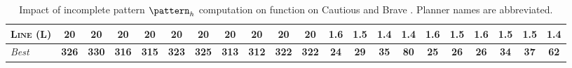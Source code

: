 \begin{table}[tb]
{\begin{tabular}{|l||cccccccccc||cccccccccc||}
\textsc{Line} (L)&\textbf{20}&\textbf{20}&\textbf{20}&\textbf{20}&\textbf{20}&\textbf{20}&\textbf{20}&\textbf{20}&\textbf{20}&\textbf{20}&1.6&1.5&\textbf{1.4}&\textbf{1.4}&1.6&1.5&1.6&1.5&1.5&\textbf{1.4}
\\\hline
\textit{Best}&\textbf{326}&\textbf{330}&\textbf{316}&\textbf{315}&\textbf{323}&\textbf{325}&\textbf{313}&\textbf{312}&\textbf{322}&\textbf{322}&\textbf{24}&\textbf{29}&\textbf{35}&\textbf{80}&\textbf{25}&\textbf{26}&\textbf{26}&\textbf{34}&\textbf{37}&\textbf{62}\\\hline

        \end{tabular}}
        \caption{Impact of incomplete pattern $\pattern_h$ computation on function on Cautious and Brave \pattyd. Planner names are abbreviated.}
        \label{tab:abl-patternh-incomplete}
        \end{table}
        